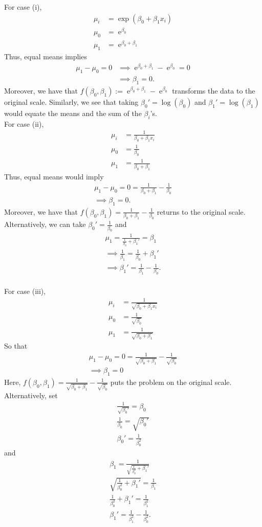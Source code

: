 \documentclass[11pt]{article}
\newcommand*\ba{\[ \begin{aligned}}
\newcommand*\ea{\end{aligned} \]}
\newcommand\e{\operatorname{e}}
\renewcommand\;{\,}
\begin{document}
For case (i),
\ba
\mu_i & = \exp\left(\beta_0 + \beta_1 x_i\right) \\
\mu_0 & = \e^{\beta_0} \\
\mu_1 & = \e^{\beta_0 + \beta_1}
\ea
Thus, equal means implies
\ba
\mu_1 - \mu_0 = 0 & \implies \e^{\beta_0 + \beta_1} - \e^{\beta_0} = 0 \\
    & \implies \beta_1 = 0.
\ea
Moreover, we have that
$f(\beta_0, \beta_1) := \e^{\beta_0 + \beta_1} - \e^{\beta_0}$ transforms the data to the original scale. Similarly, we see that taking $\beta_0' = \log(\beta_0)$ and $\beta_1' = \log(\beta_1)$ would equate the means and the sum of the $\beta_i$'s. 
\\
For case (ii),
\ba
\mu_i & = \frac{1}{\beta_0 + \beta_1 x_i} \\
\mu_0 & = \frac{1}{\beta_0} \\
\mu_1 & = \frac{1}{\beta_0 + \beta_1}
\ea
Thus, equal means would imply
\ba
\mu_1 - \mu_0 = 0 = \frac{1}{\beta_0 + \beta_1} - \frac{1}{\beta_0} \\
\implies \beta_1 = 0.
\ea
Moreover, we have that $f(\beta_0, \beta_1) = \frac{1}{\beta_0 + \beta_1} - \frac{1}{\beta_0}$ returns to the original scale.
Alternatively, we can take $\beta_0' = \frac{1}{\beta_0}$ and
\ba
\mu_1 = \frac{1}{\frac{1}{\beta_0} + \beta_1' } = \beta_1 \\
\implies \frac{1}{\beta_1} = \frac{1}{\beta_0} + \beta_1' \\
\implies \beta_1' = \frac{1}{\beta_1} - \frac{1}{\beta_0}. 
\ea
\\
For case (iii),
\ba
\mu_i & = \frac{1}{\sqrt{\beta_0 + \beta_1 x_i}} \\
\mu_0 & = \frac{1}{\sqrt{\beta_0}} \\
\mu_1 & = \frac{1}{\sqrt{\beta_0 + \beta_1}}
\ea
So that
\ba
\mu_1 - \mu_0 = 0 = \frac{1}{\sqrt{\beta_0 + \beta_1}} - \frac{1}{\sqrt{\beta_0}} \\
\implies \beta_1 = 0
\ea
Here, $f(\beta_0, \beta_1) = \frac{1}{\sqrt{\beta_0 + \beta_1}} - \frac{1}{\sqrt{\beta_0}}$ puts the problem on the original scale. Alternatively, set
\ba
\frac{1}{\sqrt{\beta_0'}} = \beta_0 \\
\frac{1}{\beta_0} = \sqrt{\beta_0'} \\
\beta_0' = \frac{1}{\beta_0^2}
\ea
and
\ba
\beta_1 = \frac{1}{\sqrt{ \frac{1}{\beta_0^2} + \beta_1' }} \\
\sqrt{\frac{1}{\beta_0^2} + \beta_1'} = \frac{1}{\beta_1} \\
\frac{1}{\beta_0^2} + \beta_1' = \frac{1}{\beta_1^2} \\
\beta_1' = \frac{1}{\beta_1^2} - \frac{1}{\beta_0^2}. 
\ea
\end{document}
